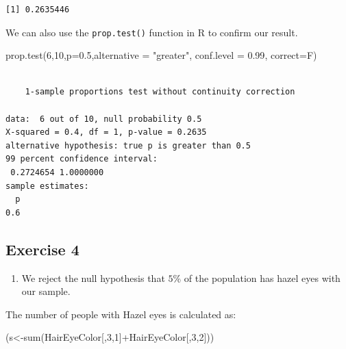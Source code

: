 \documentclass[
  letterpaper,
  DIV=11,
  numbers=noendperiod]{scrreprt}
\newenvironment{Shaded}{\begin{snugshade}}{\end{snugshade}}
\newcommand{\AttributeTok}[1]{\textcolor[rgb]{0.40,0.45,0.13}{#1}}
\newcommand{\DecValTok}[1]{\textcolor[rgb]{0.68,0.00,0.00}{#1}}
\newcommand{\FloatTok}[1]{\textcolor[rgb]{0.68,0.00,0.00}{#1}}
\newcommand{\FunctionTok}[1]{\textcolor[rgb]{0.28,0.35,0.67}{#1}}
\newcommand{\NormalTok}[1]{\textcolor[rgb]{0.00,0.23,0.31}{#1}}
\newcommand{\OtherTok}[1]{\textcolor[rgb]{0.00,0.23,0.31}{#1}}
\newcommand{\SpecialCharTok}[1]{\textcolor[rgb]{0.37,0.37,0.37}{#1}}
\newcommand{\StringTok}[1]{\textcolor[rgb]{0.13,0.47,0.30}{#1}}
\providecommand{\tightlist}{%
  \setlength{\itemsep}{0pt}\setlength{\parskip}{0pt}}\usepackage{longtable,booktabs,array}
\begin{document}
\begin{verbatim}
[1] 0.2635446
\end{verbatim}

We can also use the \texttt{prop.test()} function in R to confirm our
result.

\begin{Shaded}
\begin{Highlighting}[numbers=left,,]
\FunctionTok{prop.test}\NormalTok{(}\DecValTok{6}\NormalTok{,}\DecValTok{10}\NormalTok{,}\AttributeTok{p=}\FloatTok{0.5}\NormalTok{,}\AttributeTok{alternative =} \StringTok{"greater"}\NormalTok{, }\AttributeTok{conf.level =} \FloatTok{0.99}\NormalTok{,}
            \AttributeTok{correct=}\NormalTok{F)}
\end{Highlighting}
\end{Shaded}

\begin{verbatim}

    1-sample proportions test without continuity correction

data:  6 out of 10, null probability 0.5
X-squared = 0.4, df = 1, p-value = 0.2635
alternative hypothesis: true p is greater than 0.5
99 percent confidence interval:
 0.2724654 1.0000000
sample estimates:
  p 
0.6 
\end{verbatim}

\hypertarget{exercise-4-15}{%
\subsection*{Exercise 4}\label{exercise-4-15}}

\begin{enumerate}
\def\labelenumi{\arabic{enumi}.}
\tightlist
\item
  We reject the null hypothesis that \(5\)\% of the population has hazel
  eyes with our sample.
\end{enumerate}

The number of people with Hazel eyes is calculated as:

\begin{Shaded}
\begin{Highlighting}[numbers=left,,]
\NormalTok{(s}\OtherTok{\textless{}{-}}\FunctionTok{sum}\NormalTok{(HairEyeColor[,}\DecValTok{3}\NormalTok{,}\DecValTok{1}\NormalTok{]}\SpecialCharTok{+}\NormalTok{HairEyeColor[,}\DecValTok{3}\NormalTok{,}\DecValTok{2}\NormalTok{]))}
\end{Highlighting}
\end{Shaded}
\end{document}

